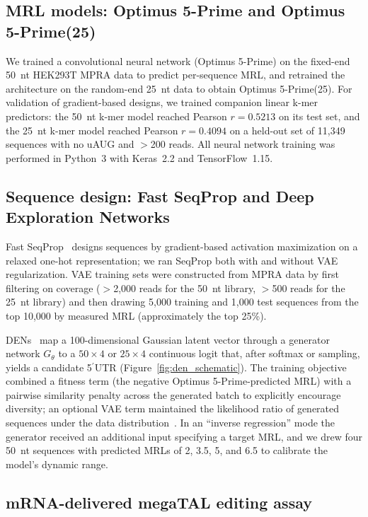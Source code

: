 \documentclass[11pt]{article}
\begin{document}
\subsection{MRL models: Optimus 5-Prime and Optimus 5-Prime(25)}

We trained a convolutional neural network (Optimus 5-Prime) on the
fixed-end 50~nt HEK293T MPRA data to predict per-sequence MRL, and
retrained the architecture on the random-end 25~nt data to obtain
Optimus 5-Prime(25). For validation of gradient-based designs, we
trained companion linear k-mer predictors: the 50~nt k-mer model
reached Pearson $r = 0.5213$ on its test set, and the 25~nt k-mer
model reached Pearson $r = 0.4094$ on a held-out set of 11{,}349
sequences with no uAUG and $>$200 reads. All neural network training
was performed in Python~3 with Keras~2.2 and TensorFlow~1.15.

\subsection{Sequence design: Fast SeqProp and Deep Exploration Networks}

Fast SeqProp~\citep{linder2021fastseqprop} designs sequences by
gradient-based activation maximization on a relaxed one-hot
representation; we ran SeqProp both with and without VAE regularization.
VAE training sets were constructed from MPRA data by first filtering
on coverage ($>$2{,}000 reads for the 50~nt library, $>$500 reads for
the 25~nt library) and then drawing 5{,}000 training and 1{,}000 test
sequences from the top 10{,}000 by measured MRL
(approximately the top 25\%).

DENs~\citep{linder2020den} map a 100-dimensional Gaussian latent vector
through a generator network $G_\theta$ to a $50\times4$ or $25\times4$
continuous logit that, after softmax or sampling, yields a candidate
5$^\prime$UTR (Figure~\ref{fig:den_schematic}). The training
objective combined a fitness term (the negative Optimus 5-Prime-predicted
MRL) with a pairwise similarity penalty across the generated batch to
explicitly encourage diversity; an optional VAE term maintained the
likelihood ratio of generated sequences under the data
distribution~\citep{linder2020den}. In an ``inverse regression'' mode
the generator received an additional input specifying a target MRL,
and we drew four 50~nt sequences with predicted MRLs of 2, 3.5, 5,
and 6.5 to calibrate the model's dynamic range.

\subsection{mRNA-delivered megaTAL editing assay}
\end{document}
